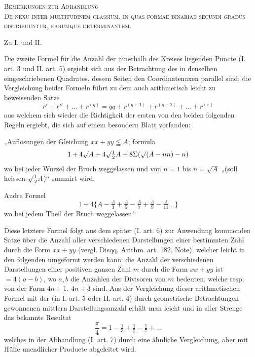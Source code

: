 \par\bigskip{}
\begin{center}
\textsc{Bemerkungen zur Abhandlung}\\[1em]
\textsc{De nexu inter multitudinem classium, in quas formae binariae secundi gradus distribuuntur, earumque determinantem.}
\end{center}
\par\medskip{}\centerline{Zu I. und II.}\smallskip

Die zweite Formel für die Anzahl der innerhalb des Kreises liegenden Puncte (I. art. 3 und II. art. 5) ergiebt sich aus der Betrachtung des in denselben eingeschriebenen Quadrates, dessen Seiten den Coordinatenaxen parallel sind; die Vergleichung beider Formeln führt zu dem auch arithmetisch leicht zu beweisenden Satze
\[
r'+r''+\ldots+r^{(q)}=qq+r^{(q+1)}+r^{(q+2)}+\ldots+r^{(r)}
\]
aus welchem sich wieder die Richtigkeit der ersten von den beiden folgenden Regeln ergiebt, die sich auf einem besondern Blatt vorfanden:

„Auflösungen der Gleichung $xx+yy\leqq A$; formula
\[
1+4\surd A+4\surd\tfrac12 A+8\Sigma(\surd(A-nn)-n)
\]
wo bei jeder Wurzel der Bruch weggelassen und von $n=1$ bis $n=\surd A$ „(soll heissen $\surd\tfrac12 A$)“ summirt wird.

Andre Formel
\[
1+4\{A-\tfrac A3+\tfrac A5-\tfrac A7+\tfrac A9-\tfrac A{11}\ldots\}
\]
wo bei jedem Theil der Bruch weggelassen.“

Diese letztere Formel folgt aus dem später (I. art. 6) zur Anwendung kommenden Satze über die Anzahl aller verschiedenen Darstellungen einer bestimmten Zahl durch die Form $xx+yy$ (vergl. Disqq. Arithm. art. 182, Note), welcher leicht in den folgenden umgeformt werden kann: die Anzahl der verschiedenen Darstellungen einer positiven ganzen Zahl $m$ durch die Form $xx+yy$ ist $=4(a-b)$, wo $a,b$ die Anzahlen der Divisoren von $m$ bedeuten, welche resp. von der Form $4n+1,\ 4n+3$ sind. Aus der Vergleichung
dieser arithmetischen Formel mit der (in I. art. 5 oder II. art. 4) durch geometrische Betrachtungen gewonnenen mittlern Darstellungsanzahl erhält man leicht und in aller Strenge das bekannte Resultat
\[
\frac\pi4=1-\tfrac13+\tfrac15-\tfrac17+\ldots
\]
welches in der Abhandlung (I. art. 7) durch eine ähnliche Vergleichung, aber mit Hülfe unendlicher Producte abgeleitet wird.
